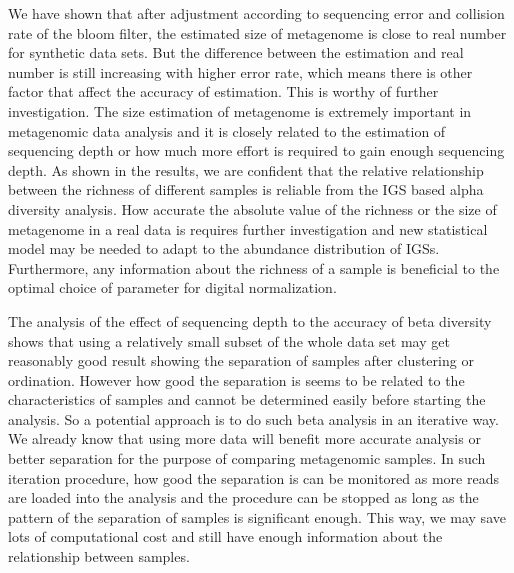 We have shown that after adjustment according to sequencing error and collision
rate of the bloom filter, the estimated size of metagenome is close to real
number for synthetic data sets. But the difference between the estimation and
real number is still increasing with higher error rate, which means there is
other factor that affect the accuracy of estimation. This is worthy of further
investigation. The size estimation of metagenome is extremely important in
metagenomic data analysis and it is closely related to the estimation of
sequencing depth or how much more effort is required to gain enough sequencing
depth. As shown in the results, we are confident that the relative relationship 
between the richness of different samples is reliable from the IGS based alpha
diversity analysis. How accurate the absolute value of the richness or the size
of metagenome in a real data is requires further investigation and new  
statistical model may be needed to adapt to the abundance distribution of IGSs.    
Furthermore, any information about the richness of a sample is beneficial to
the optimal choice of parameter for digital normalization.

The analysis of the effect of sequencing depth to the accuracy of beta
diversity shows that using a relatively small subset of the whole data set may
get reasonably good result showing the separation of samples after clustering
or ordination. However how good the separation is seems to be related to the
characteristics of samples and cannot be determined easily before starting the
analysis. So a potential approach is to do such beta analysis in an iterative
way. We already know that using more data will benefit more accurate analysis or better
separation for the purpose of comparing metagenomic samples. In such
iteration procedure, how good the separation is can be monitored as more reads
are loaded into the analysis and the procedure can be stopped as long as the
pattern of the separation of samples is significant enough. This way, we may
save lots of computational cost and still have enough information about the
relationship between samples. 
 
    
    
    
    
    
    

